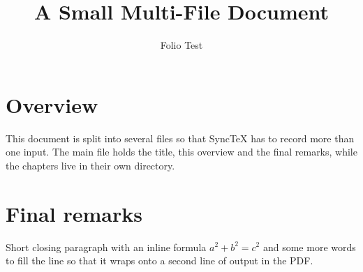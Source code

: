 \documentclass[11pt]{article}
\title{A Small Multi-File Document}
\author{Folio Test}
\begin{document}
\maketitle

\section{Overview}
This document is split into several files so that SyncTeX has to
record more than one input. The main file holds the title, this
overview and the final remarks, while the chapters live in their
own directory.




\section{Final remarks}
Short closing paragraph with an inline formula $a^2 + b^2 = c^2$ and
some more words to fill the line so that it wraps onto a second line
of output in the PDF.
\end{document}
